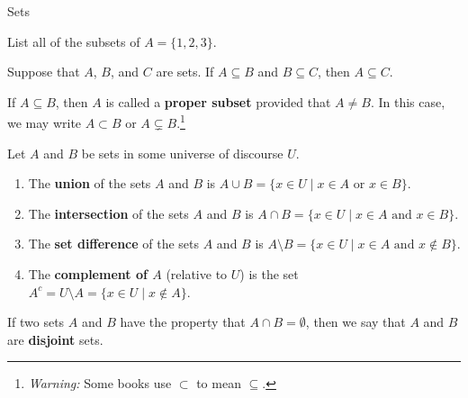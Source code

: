 \begin{section}{Sets}
\begin{problem}
List all of the subsets of $A=\{1,2,3\}$.  %
\end{problem}

\begin{theorem}
Suppose that $A$, $B$, and $C$ are sets.  If $A\subseteq B$ and $B\subseteq C$, then $A\subseteq C$.
\end{theorem}

\begin{definition}
If $A\subseteq B$, then $A$ is called a \textbf{proper subset} provided that $A\neq B$.  In this case, we may write $\boxed{A\subset B}$ or $\boxed{A\subsetneq B}$.\footnote{\emph{Warning:} Some books use $\subset$ to mean $\subseteq$.}
\end{definition}

\begin{definition}
Let $A$ and $B$ be sets in some universe of discourse $U$.
\begin{enumerate}[label=\textrm{(\alph*)}]
\item The \textbf{union} of the sets $A$ and $B$ is $\boxed{A \cup B} =\{x\in U \mid x\in A \mbox{ or } x\in B \}$.
\item The \textbf{intersection} of the sets $A$ and $B$ is $\boxed{A \cap B} =\{x\in U \mid x\in A \mbox{ and } x\in B \}$.
\item The \textbf{set difference} of the sets $A$ and $B$ is $\boxed{A \setminus B} =\{x\in U \mid x\in A \mbox{ and } x\notin B \}$.
\item The \textbf{complement of $A$} (relative to $U$) is the set $\boxed{A^c}=U \setminus A =\{x \in U \mid x \notin A\}$.
\end{enumerate}
\end{definition}

\begin{definition}
If two sets $A$ and $B$ have the property that $A \cap B = \emptyset$, then we say that $A$ and $B$ are \textbf{disjoint} sets.
\end{definition}


\end{section}
